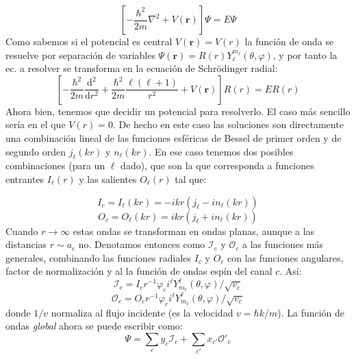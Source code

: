 \documentclass[fleqn,10pt]{SelfArx} %
\newcommand{\parentesis}[1]{\left( #1  \right)}
\newcommand{\D}{\mathrm{d}}
\newcommand{\derivadas}[2]{\frac{\D #1}{\D #2}}
\newcommand{\rn}{\mathbf{r}}
\newcommand{\Ical}{\mathcal{I}}
\newcommand{\Ocal}{\mathcal{O}}
\begin{document}
\begin{equation}
	\left[ - \frac{\hbar^2}{2m} \nabla^2 + V(\rn) \right] \Psi = E \Psi
\end{equation}
Como sabemos si el potencial es central $V(\rn)=V(r)$ la función de onda se resuelve por separación de variables $\Psi(\rn)=R(r) Y_\ell^{m_\ell} (\theta,\varphi)$, y por tanto la ec. a resolver se transforma en la ecuación de Schrödinger radial:  
\begin{equation}
	\left[- \frac{\hbar^2}{2m} \derivadas{^2}{r^2} + \frac{\hbar^2}{2m} \frac{\ell (\ell+1)}{r^2} +  V(\rn) \right] R(r) = E R(r)
\end{equation}
Ahora bien, tenemos que decidir un potencial para resolverlo. El caso más sencillo sería en el que $V(r)=0$. De hecho en este caso las soluciones son directamente una combinación lineal de las funciones esféricas de Bessel de primer orden y de segundo orden $j_\ell(kr)$ y $n_\ell (kr)$. En ese caso tenemos dos posibles combinaciones (para un $\ell$ dado), que son la que corresponda a funciones entrantes $I_\ell (r)$ y las salientes $O_\ell (r)$ tal que:

\begin{equation}
 I_c =	I_\ell (kr) = - i kr \parentesis{j_\ell-in_\ell (kr)}
\end{equation}
\begin{equation}
 O_c =	O_\ell (kr) = i kr \parentesis{j_\ell+in_\ell (kr)} 
\end{equation}
Cuando $r\rightarrow\infty$ estas ondas se transforman en ondas planas, aunque a las distancias $r\sim a_c$ no. Denotamos entonces como $\Ical_c$ y $\Ocal_c$ a las funciones más generales, combinando las funciones radiales $I_c$ y $O_c$ con las funciones angulares, factor de normalización y al la función de ondas espín del canal $c$. Así:
\begin{equation}
	\Ical_c =	I_c r^{-1} \varphi_c i^\ell Y_{m_\ell}^{\ell} (\theta,\varphi) / \sqrt{v_c}
\end{equation}
\begin{equation}
	\Ocal_c =	O_c r^{-1}\varphi_c i^\ell Y_{m_\ell}^{\ell} (\theta,\varphi) / \sqrt{v_c}
\end{equation}
donde $1/v$ normaliza al flujo incidente (es la velocidad $v=\hbar k / m$). La función de ondas \textit{global} ahora se puede escribir como:
\begin{equation}
	\Psi =\sum_c y_c \Ical_c + \sum_{c'} x_{c'} \Ocal'_c 
\end{equation}
\end{document}
